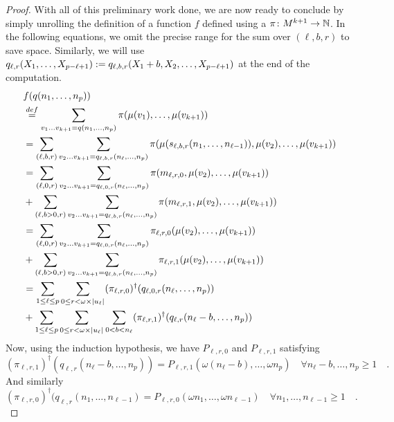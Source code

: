 \begin{proof}
    With all of this preliminary work done, we are now ready to conclude by
    simply unrolling the definition of 
    a function
    $f$ defined using a 
    $\pi \colon M^{k+1} \to \mathbb{N}$.
    In the following equations, we omit the precise
    range for the sum over $(\ell, b, r)$ to save space.
    Similarly, we will use 
    $q_{\ell,r}(X_1, \dots, X_{p-\ell+1})
    \mathrel{:=} q_{\ell,b,r}(X_1+b, X_2, \dots, X_{p - \ell + 1})$
    at the end of the computation.
    \begin{align*}
        &f(q(n_1, \dots, n_p))\\
        &\eqdef 
        \sum_{v_1 \dots v_{k+1} = q(n_1, \dots, n_p)}
        \pi(\mu(v_1), \dots, \mu(v_{k+1})) \\
        &= \sum_{(\ell, b, r)}
           \sum_{v_2 \dots v_{k+1} = q_{\ell,b,r}(n_\ell, \dots, n_p)}
           \pi(\mu(s_{\ell,b,r}(n_1, \dots, n_{\ell-1})), \mu(v_2), \dots, \mu(v_{k+1}))
        \\
        &= 
           \sum_{(\ell, 0, r)}
           \sum_{v_2 \dots v_{k+1} = q_{\ell,0,r}(n_\ell, \dots, n_p)}
           \pi(m_{\ell,r,0}, \mu(v_2), \dots, \mu(v_{k+1}))
           \\
        &+ 
           \sum_{(\ell, b > 0, r)}
           \sum_{v_2 \dots v_{k+1} = q_{\ell,b,r}(n_\ell, \dots, n_p)}
           \pi(m_{\ell,r,1}, \mu(v_2), \dots, \mu(v_{k+1}))
        \\
        &= 
           \sum_{(\ell, 0, r)}
           \sum_{v_2 \dots v_{k+1} = q_{\ell,0,r}(n_\ell, \dots, n_p)}
           \pi_{\ell,r,0}(\mu(v_2), \dots, \mu(v_{k+1}))
           \\
        &+ 
           \sum_{(\ell, b > 0, r)}
           \sum_{v_2 \dots v_{k+1} = q_{\ell,b,r}(n_\ell, \dots, n_p)}
           \pi_{\ell,r,1}(\mu(v_2), \dots, \mu(v_{k+1}))
        \\
        &= 
           \sum_{1 \leq \ell \leq p}
           \sum_{0 \leq r < \omega \times \card{u_\ell}}
           (\pi_{\ell,r,0})^\dagger (q_{\ell, 0, r}(n_\ell, \dots, n_p))
           \\
        &+ 
           \sum_{1 \leq \ell \leq p}
           \sum_{0 \leq r < \omega \times \card{u_\ell}}
           \sum_{0 < b < n_\ell}
           (\pi_{\ell,r,1})^{\dagger}(q_{\ell,r}(n_\ell - b, \dots, n_p))
    \end{align*}
    Now, using the induction hypothesis,
    we have  $P_{\ell,r,0}$ and $P_{\ell,r,1}$
    satisfying 
    \begin{equation*}
       (\pi_{\ell,r,1})^{\dagger}(q_{\ell,r}(n_\ell - b, \dots, n_p))
       = P_{\ell,r,1}(\omega (n_\ell - b), \dots, \omega n_p)
       \quad 
       \forall n_\ell - b, \dots, n_p \geq 1
       \quad .
   \end{equation*}
   And similarly
    \begin{equation*}
        (\pi_{\ell,r,0})^{\dagger}(q_{\ell,r}(n_1, \dots, n_{\ell-1})
        = P_{\ell,r,0}(\omega n_1, \dots, \omega n_{\ell-1})
       \quad 
       \forall n_1, \dots, n_{\ell - 1} \geq 1
       \quad .
   \end{equation*}


\end{proof}

